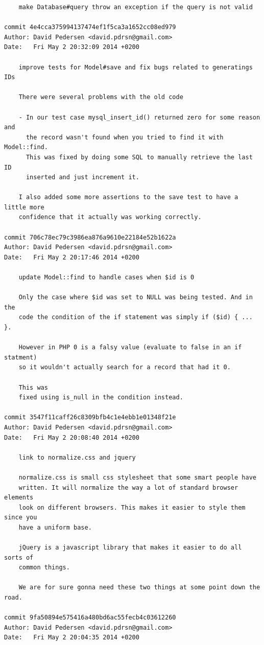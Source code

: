 \documentclass[12pt]{article}
\begin{document}
\begin{verbatim}
    make Database#query throw an exception if the query is not valid

commit 4e4cca375994137474ef1f5ca3a1652cc08ed979
Author: David Pedersen <david.pdrsn@gmail.com>
Date:   Fri May 2 20:32:09 2014 +0200

    improve tests for Model#save and fix bugs related to generatings IDs
    
    There were several problems with the old code
    
    - In our test case mysql_insert_id() returned zero for some reason and
      the record wasn't found when you tried to find it with Model::find.
      This was fixed by doing some SQL to manually retrieve the last ID
      inserted and just increment it.
    
    I also added some more assertions to the save test to have a little more
    confidence that it actually was working correctly.

commit 706c78ec79c3986ea876a9610e22184e52b1622a
Author: David Pedersen <david.pdrsn@gmail.com>
Date:   Fri May 2 20:17:46 2014 +0200

    update Model::find to handle cases when $id is 0
    
    Only the case where $id was set to NULL was being tested. And in the
    code the condition of the if statement was simply if ($id) { ... }.
    
    However in PHP 0 is a falsy value (evaluate to false in an if statment)
    so it wouldn't actually search for a record that had it 0.
    
    This was
    fixed using is_null in the condition instead.

commit 3547f11caff26c8309bfb4c1e4ebb1e01348f21e
Author: David Pedersen <david.pdrsn@gmail.com>
Date:   Fri May 2 20:08:40 2014 +0200

    link to normalize.css and jquery
    
    normalize.css is small css stylesheet that some smart people have
    written. It will normalize the way a lot of standard browser elements
    look on different browsers. This makes it easier to style them since you
    have a uniform base.
    
    jQuery is a javascript library that makes it easier to do all sorts of
    common things.
    
    We are for sure gonna need these two things at some point down the road.

commit 9fa50894e575416a480bd6ac55fecb4c03612260
Author: David Pedersen <david.pdrsn@gmail.com>
Date:   Fri May 2 20:04:35 2014 +0200


\end{verbatim}
\end{document}

